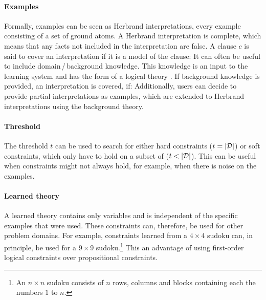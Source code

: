 \paragraph{Examples}
Formally, examples can be seen as Herbrand interpretations, every example consisting of a set of ground atoms.
A Herbrand interpretation is complete, which means that any facts not included in the interpretation are false.
A clause $c$ is said to cover an interpretation  if it is a model of the clause: 
It can often be useful to include domain\,/\,background knowledge.
This knowledge is an input to the learning system and has the form of a logical theory .
If background knowledge is provided, an interpretation  is covered, if: 
Additionally, users can decide to provide partial interpretations as examples, which are extended to Herbrand interpretations using the background theory.

\paragraph{Threshold}
The threshold $t$ can be used to search for either hard constraints ($t = |\mathcal{D}|$) or soft constraints, which only have to hold on a subset of  ($t < |\mathcal{D}|$).
This can be useful when constraints might not always hold, for example, when there is noise on the examples.

\paragraph{Learned theory}
A learned theory  contains only variables and is independent of the specific examples that were used.
These constraints can, therefore, be used for other problem domains.
For example, constraints learned from a $4 \times 4$ sudoku can, in principle, be used for a $9 \times 9$ sudoku.\footnote{An $n \times n$ sudoku consists of $n$ rows, columns and blocks containing each the numbers $1$ to $n$.}
This an advantage of using first-order logical constraints over propositional constraints.


